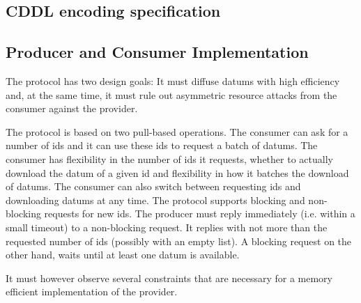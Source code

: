 \subsection{CDDL encoding specification}\label{tx-submission2-cddl}

\fi

\subsection{Producer and Consumer Implementation}
The protocol has two design goals: It must diffuse datums with high efficiency
and, at the same time, it must rule out
asymmetric resource attacks from the consumer against the provider.

The protocol is based on two pull-based operations.
The consumer can ask for a number of ids and it can use these
ids to request a batch of datums.
The consumer has flexibility in the number of ids it requests,
whether to actually download the datum of a given id
and flexibility in how it batches the download of datums.
The consumer can also switch between requesting ids and downloading
datums at any time. The protocol supports blocking and non-blocking requests for new ids.
The producer must reply immediately (i.e. within a small timeout) to a non-blocking request.
It replies with not more than the requested number of ids (possibly with an empty list).
A blocking request on the other hand, waits until at least one datum is available.


It must however observe several constraints that are necessary for a
memory efficient implementation of the provider.


